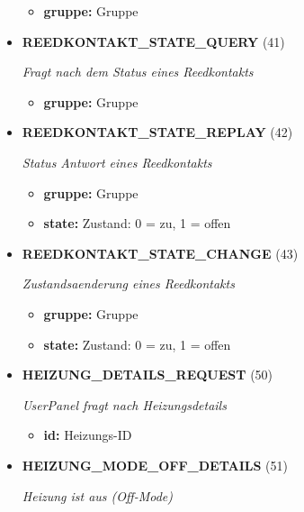 \begin{itemize}
\small
\begin{itemize}
		
\item \textbf{gruppe:} Gruppe
\end{itemize}
\normalsize
	
\item \textbf{REEDKONTAKT\_STATE\_QUERY} (41)

\textit{Fragt nach dem Status eines Reedkontakts}

\small
\begin{itemize}
		
\item \textbf{gruppe:} Gruppe
\end{itemize}
\normalsize
	
\item \textbf{REEDKONTAKT\_STATE\_REPLAY} (42)

\textit{Status Antwort eines Reedkontakts}

\small
\begin{itemize}
		
\item \textbf{gruppe:} Gruppe
\item \textbf{state:} Zustand: 0 = zu, 1 = offen
\end{itemize}
\normalsize
	
\item \textbf{REEDKONTAKT\_STATE\_CHANGE} (43)

\textit{Zustandsaenderung eines Reedkontakts}

\small
\begin{itemize}
		
\item \textbf{gruppe:} Gruppe
\item \textbf{state:} Zustand: 0 = zu, 1 = offen
\end{itemize}
\normalsize
	
\item \textbf{HEIZUNG\_DETAILS\_REQUEST} (50)

\textit{UserPanel fragt nach Heizungsdetails}

\small
\begin{itemize}
		
\item \textbf{id:} Heizungs-ID
\end{itemize}
\normalsize
	
\item \textbf{HEIZUNG\_MODE\_OFF\_DETAILS} (51)

\textit{Heizung ist aus (Off-Mode)}


\end{itemize}
